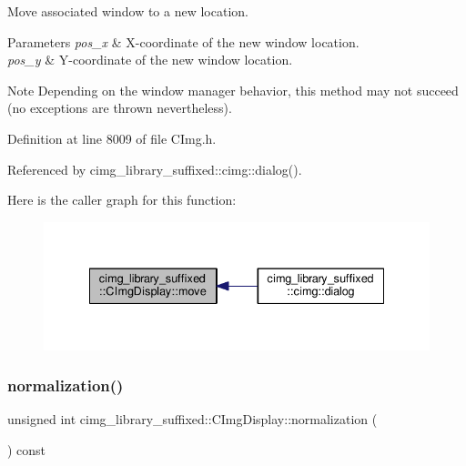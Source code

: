 Move associated window to a new location. 


\begin{DoxyParams}{Parameters}
{\em pos\+\_\+x} & X-\/coordinate of the new window location. \\
\hline
{\em pos\+\_\+y} & Y-\/coordinate of the new window location. \\
\hline
\end{DoxyParams}
\begin{DoxyNote}{Note}
Depending on the window manager behavior, this method may not succeed (no exceptions are thrown nevertheless). 
\end{DoxyNote}


Definition at line 8009 of file C\+Img.\+h.



Referenced by cimg\+\_\+library\+\_\+suffixed\+::cimg\+::dialog().

Here is the caller graph for this function\+:
\nopagebreak
\begin{figure}[H]
\begin{center}
\leavevmode
\includegraphics[width=335pt]{d5/d53/structcimg__library__suffixed_1_1CImgDisplay_aba5d6f1e8a3f1d086ca4defe91aa94a6_icgraph}
\end{center}
\end{figure}
\mbox{\label{structcimg__library__suffixed_1_1CImgDisplay_a79b6f929fe4aaf411051fc85862191a7}} 
\subsubsection{\texorpdfstring{normalization()}{normalization()}}
{\footnotesize\ttfamily unsigned int cimg\+\_\+library\+\_\+suffixed\+::\+C\+Img\+Display\+::normalization (\begin{DoxyParamCaption}{ }\end{DoxyParamCaption}) const\hspace{0.3cm}{\ttfamily [inline]}}



